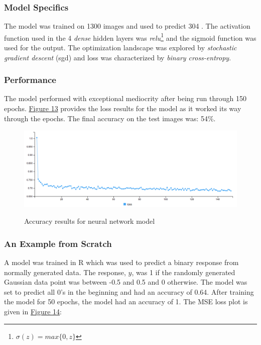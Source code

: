 \documentclass{article}
\begin{document}
\subsubsection{Model Specifics}

\noindent The model was trained on 1300 images and used to predict 304 \cite{allaire}. The activation function used in the 4 \textit{dense} hidden layers was \textit{relu}\footnote{$\sigma(z) = max\{0, z\}$} and the sigmoid function was used for the output. The optimization landscape was explored by \textit{stochastic gradient descent} (sgd) and loss was characterized by \textit{binary cross-entropy}.

\subsubsection{Performance}

\noindent The model performed with exceptional mediocrity after being run through 150 epochs. \hyperref[fig:lossNN]{Figure 13} provides the loss results for the model as it worked its way through the epochs. The final accuracy on the test images was: 54\%.

\begin{figure}[h!]
  \centering
  \includegraphics[scale = 0.4]{loss_plot3.png}
  \label{fig:lossNN}
  \caption{Accuracy results for neural network model}
\end{figure}

\subsubsection{An Example from Scratch}

\noindent A model was trained in R which was used to predict a binary response from normally generated data. The response, $y$, was 1 if the randomly generated Gaussian data point was between -0.5 and 0.5 and 0 otherwise. The model was set to predict all 0's in the beginning and had an accuracy of 0.64. After training the model for 50 epochs, the  model had an accuracy of 1. The MSE loss plot is given in \hyperref[fig:scratchNN]{Figure 14}:
\end{document}
